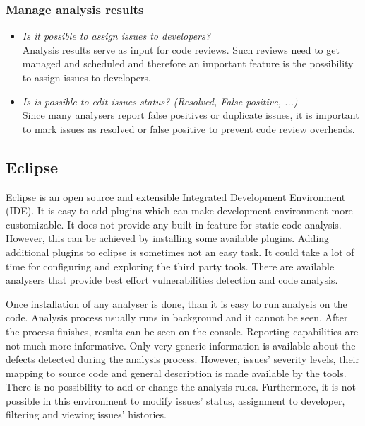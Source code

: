\documentclass[conference]{IEEEtran}
\begin{document}
\subsubsection{Manage analysis results}
\label{subsubsec:evaluation_manage}
\begin{itemize}
	\item \textit{Is it possible to assign issues to developers?} \\
	Analysis results serve as input for code reviews. Such reviews need to get managed and scheduled and therefore an important feature is the possibility to assign issues to developers.
	
	\item \textit{Is is possible to edit issues status? (Resolved, False positive, ...)} \\
	Since many analysers report false positives or duplicate issues, it is important to mark issues as resolved or false positive to prevent code review overheads.
\end{itemize}


\subsection{Eclipse}
\label{subsec:evaluation_eclipse}

Eclipse is an open source and extensible Integrated Development Environment (IDE). It is easy to add plugins which can make development environment more customizable. It does not provide any built-in feature for static code analysis. However, this can be achieved by installing some available plugins. Adding additional plugins to eclipse is sometimes not an easy task. It could take a lot of time for configuring and exploring the third party tools. There are available analysers that provide best effort vulnerabilities detection and code analysis.

Once installation of any analyser is done, than it is easy to run analysis on the code. Analysis process usually runs in background and it cannot be seen. After the process finishes, results can be seen on the console. Reporting capabilities are not much more informative. Only very generic information is available about the defects detected during the analysis process. However, issues' severity levels, their mapping to source code and general description is made available by the tools. There is no possibility to add or change the analysis rules. Furthermore, it is not possible in this environment to modify issues' status, assignment to developer, filtering and viewing issues' histories.
\end{document}
